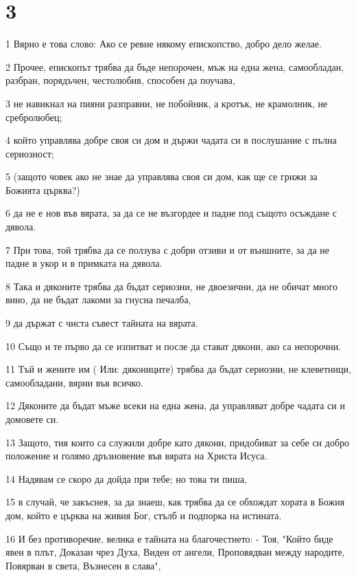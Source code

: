 \chapter{3}

\par 1 Вярно е това слово: Ако се ревне някому епископство, добро дело желае.
\par 2 Прочее, епископът трябва да бъде непорочен, мъж на една жена, самообладан, разбран, порядъчен, честолюбив, способен да поучава,
\par 3 не навикнал на пияни разправии, не побойник, а кротък, не крамолник, не сребролюбец;
\par 4 който управлява добре своя си дом и държи чадата си в послушание с пълна сериозност;
\par 5 (защото човек ако не знае да управлява своя си дом, как ще се грижи за Божията църква?)
\par 6 да не е нов във вярата, за да се не възгордее и падне под същото осъждане с дявола.
\par 7 При това, той трябва да се ползува с добри отзиви и от външните, за да не падне в укор и в примката на дявола.
\par 8 Така и дяконите трябва да бъдат сериозни, не двоезични, да не обичат много вино, да не бъдат лакоми за гнусна печалба,
\par 9 да държат с чиста съвест тайната на вярата.
\par 10 Също и те първо да се изпитват и после да стават дякони, ако са непорочни.
\par 11 Тъй и жените им ( Или: дякониците) трябва да бъдат сериозни, не клеветници, самообладани, вярни във всичко.
\par 12 Дяконите да бъдат мъже всеки на една жена, да управляват добре чадата си и домовете си.
\par 13 Защото, тия които са служили добре като дякони, придобиват за себе си добро положение и голямо дръзновение във вярата на Христа Исуса.
\par 14 Надявам се скоро да дойда при тебе; но това ти пиша,
\par 15 в случай, че закъснея, за да знаеш, как трябва да се обхождат хората в Божия дом, който е църква на живия Бог, стълб и подпорка на истината.
\par 16 И без противоречие, велика е тайната на благочестието: - Тоя, "Който биде явен в плът, Доказан чрез Духа, Виден от ангели, Проповядван между народите, Повярван в света, Възнесен в слава",

